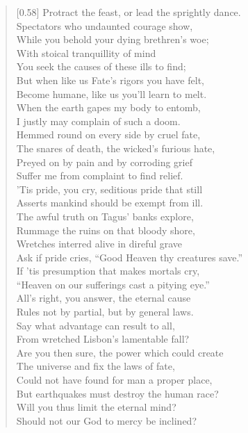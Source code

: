 \begin{verse}[0.58\textwidth]
Protract the feast, or lead the sprightly dance.\\
Spectators who undaunted courage show,\\
While you behold your dying brethren's woe;\\
With stoical tranquillity of mind\\
You seek the causes of these ills to find;\\
But when like us Fate's rigors you have felt,\\
Become humane, like us you'll learn to melt.\\
When the earth gapes my body to entomb,\\
I justly may complain of such a doom.\\
Hemmed round on every side by cruel fate,\\
The snares of death, the wicked's furious hate,\\
Preyed on by pain and by corroding grief\\
Suffer me from complaint to find relief.\\
'Tis pride, you cry, seditious pride that still\\
Asserts mankind should be exempt from ill.\\
The awful truth on Tagus' banks explore,\\
Rummage the ruins on that bloody shore,\\
Wretches interred alive in direful grave\\
Ask if pride cries, ``Good Heaven thy creatures save.''\\
If 'tis presumption that makes mortals cry,\\
``Heaven on our sufferings cast a pitying eye.''\\
All's right, you answer, the eternal cause\\
Rules not by partial, but by general laws.\\
Say what advantage can result to all,\\
From wretched Lisbon's lamentable fall?\\
Are you then sure, the power which could create\\
The universe and fix the laws of fate,\\
Could not have found for man a proper place,\\
But earthquakes must destroy the human race?\\
Will you thus limit the eternal mind?\\
Should not our God to mercy be inclined?\\

\end{verse}
